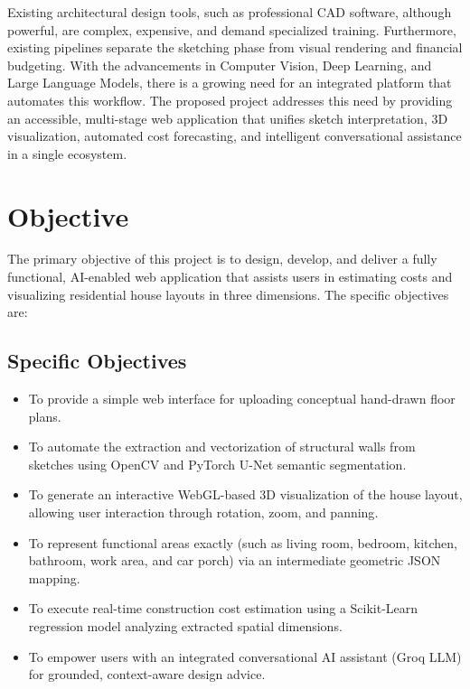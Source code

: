 \documentclass[12pt]{report}
\begin{document}
Existing architectural design tools, such as professional CAD software, although powerful, are complex, expensive, and demand specialized training\cite{eastman2018}. Furthermore, existing pipelines separate the sketching phase from visual rendering and financial budgeting\cite{wang2020}. With the advancements in Computer Vision, Deep Learning, and Large Language Models\cite{ronneberger2015, liu2017, vaswani2017}, there is a growing need for an integrated platform that automates this workflow. The proposed project addresses this need by providing an accessible, multi-stage web application that unifies sketch interpretation, 3D visualization, automated cost forecasting, and intelligent conversational assistance in a single ecosystem\cite{brown2020, fastapi2024}.

\section{Objective}

The primary objective of this project is to design, develop, and deliver a fully functional, AI-enabled web application that assists users in estimating costs and visualizing residential house layouts in three dimensions. The specific objectives are:

\subsection{Specific Objectives}

\begin{itemize}
  \item To provide a simple web interface for uploading conceptual hand-drawn floor plans.
  \item To automate the extraction and vectorization of structural walls from sketches using OpenCV and PyTorch U-Net semantic segmentation\cite{opencv2024, ronneberger2015}.
  \item To generate an interactive WebGL-based 3D visualization of the house layout, allowing user interaction through rotation, zoom, and panning\cite{threejs2024}.
  \item To represent functional areas exactly (such as living room, bedroom, kitchen, bathroom, work area, and car porch) via an intermediate geometric JSON mapping\cite{liu2017}.
  \item To execute real-time construction cost estimation using a Scikit-Learn regression model analyzing extracted spatial dimensions\cite{sklearn2024, wang2020}.
  \item To empower users with an integrated conversational AI assistant (Groq LLM) for grounded, context-aware design advice\cite{groq2024, brown2020}.
\end{itemize}
\end{document}
